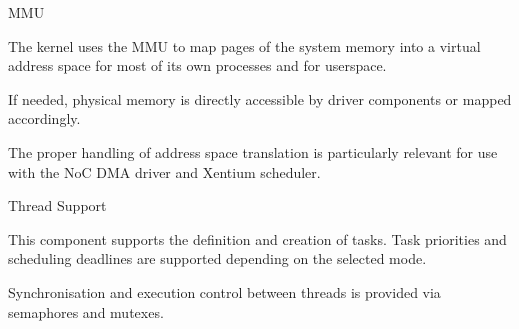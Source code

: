 %
{\gls{MMU}}{%
The kernel uses the \gls{MMU} to map pages of the system memory into a virtual
address space for most of its own processes and for userspace.

If needed, physical memory is directly accessible by driver components or
mapped accordingly.

}%
{}{The proper handling of address space translation
is particularly relevant for use with the \gls{NoC} \gls{DMA} driver and
\gls{Xentium} scheduler.}



%
{Thread Support}{%
This component supports the definition and creation of tasks. Task priorities
and scheduling deadlines are supported depending on the selected mode.\newline

Synchronisation and execution control between threads is provided via semaphores
and mutexes.
}%
{}{}


